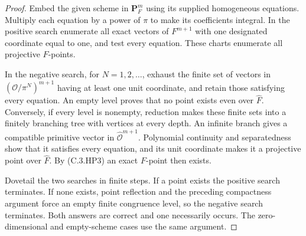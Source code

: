 \begin{proof}
Embed the given scheme in $\mathbf P_F^m$ using its supplied
homogeneous equations. Multiply each equation by a power of
$\pi$ to make its coefficients integral.
In the positive search enumerate all exact vectors of $F^{m+1}$
with one designated coordinate equal to one, and test every
equation. These charts enumerate all projective $F$-points.

In the negative search, for $N=1,2,\ldots$, exhaust the finite
set of vectors in $(\mathcal O/\pi^N)^{m+1}$ having at least
one unit coordinate, and retain those satisfying every equation.
An empty level proves that no point exists even over $\widehat F$.
Conversely, if every level is nonempty, reduction makes these
finite sets into a finitely branching tree with vertices at every
depth. An infinite branch gives a compatible primitive vector
in $\widehat{\mathcal O}^{m+1}$. Polynomial continuity and
separatedness show that it satisfies every equation, and its
unit coordinate makes it a projective point over $\widehat F$.
By (C.3.HP3) an exact $F$-point then exists.

Dovetail the two searches in finite steps. If a point exists
the positive search terminates. If none exists, point reflection
and the preceding compactness argument force an empty finite
congruence level, so the negative search terminates.
Both answers are correct and one necessarily occurs.
The zero-dimensional and empty-scheme cases use the same argument.
\end{proof}


